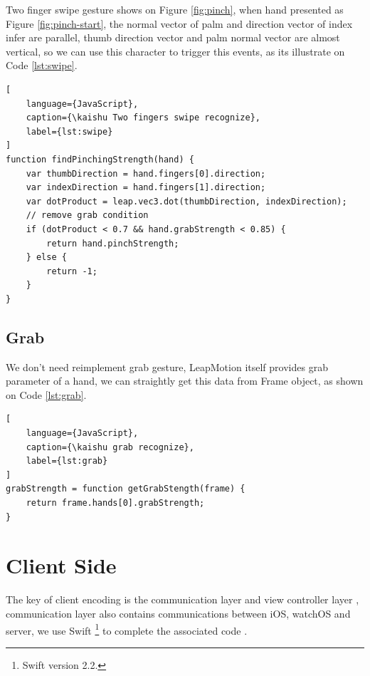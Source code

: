 Two finger swipe gesture shows on Figure \ref{fig:pinch}, when hand  presented as Figure \ref{fig:pinch-start}, the normal vector of palm and direction vector of index infer are parallel, thumb direction vector and palm normal vector are almost vertical, so we can use this character to trigger this events, as its illustrate on Code \ref{lst:swipe}.

\begin{lstlisting}[
    language={JavaScript},
    caption={\kaishu Two fingers swipe recognize},
    label={lst:swipe}
]
function findPinchingStrength(hand) {
    var thumbDirection = hand.fingers[0].direction;
    var indexDirection = hand.fingers[1].direction;
    var dotProduct = leap.vec3.dot(thumbDirection, indexDirection);
    // remove grab condition
    if (dotProduct < 0.7 && hand.grabStrength < 0.85) {
        return hand.pinchStrength;
    } else {
        return -1;
    }
}
\end{lstlisting}

\subsection{Grab}

We don't need reimplement grab gesture, LeapMotion itself provides grab parameter of a hand, we can straightly get this data from Frame object, as shown on Code \ref{lst:grab}.

\begin{lstlisting}[
    language={JavaScript},
    caption={\kaishu grab recognize},
    label={lst:grab}
]
grabStrength = function getGrabStength(frame) {
    return frame.hands[0].grabStrength;
}
\end{lstlisting}

\section{Client Side}

The key of client encoding is the communication layer and view controller layer , communication layer also contains communications between iOS, watchOS and server, we use Swift \footnote{Swift version 2.2.} to complete the associated code \cite{swift2015, swiftoc2015}.

